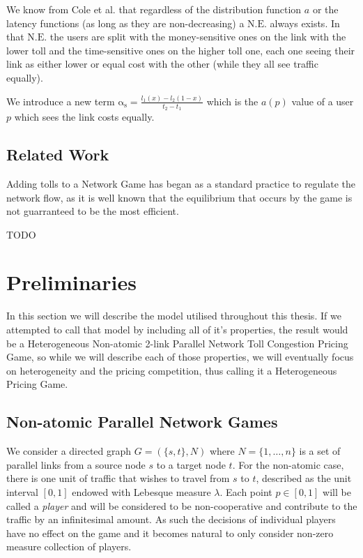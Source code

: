 \documentclass[10pt,a4paper]{book}
\newcommand{\NE}{\mathrm{N.E.}}
\newcommand{\as}{\mathrm{\alpha_s}}
\theoremstyle{definition}
\theoremstyle{comment}
\begin{document}
We know from Cole et al. \cite{10.1145/780542.780618} that regardless of the distribution function $a$ or the latency functions (as long as they are non-decreasing) a $\NE$ always exists.
In that $\NE$ the users are split with the money-sensitive ones on the link with the lower toll and the time-sensitive ones on the higher toll one, each one seeing their link as either lower or equal cost with the other (while they all see traffic equally).

We introduce a new term $\as=\frac{l_1(x)-l_2(1-x)}{t_2-t_1}$ which is the $a(p)$ value of a user $p$ which sees the link costs equally.


\section{Related Work}

Adding tolls to a Network Game has began as a standard practice to regulate the network flow, as it is well known that the equilibrium that occurs by the game is not guarranteed to be the most efficient.

TODO

\cleardoublepage


\chapter{Preliminaries}

In this section we will describe the model utilised throughout this thesis.
If we attempted to call that model by including all of it's properties, the result would be a Heterogeneous Non-atomic 2-link Parallel Network Toll Congestion Pricing Game, so while we will describe each of those properties, we will eventually focus on heterogeneity and the pricing competition, thus calling it a Heterogeneous Pricing Game.

\section*{Non-atomic Parallel Network Games}

We consider a directed graph $G = (\{s, t\}, N)$ where $N = \{1,\dots, n\}$ is a set of parallel links from a source node $s$ to a target node $t$.
For the non-atomic case, there is one unit of traffic that wishes to travel from $s$ to $t$, described as the unit interval $[0, 1]$ endowed with Lebesque measure $\lambda$.
Each point $p \in [0, 1]$ will be called a \textit{player} and will be considered to be non-cooperative and contribute to the traffic by an infinitesimal amount.
As such the decisions of individual players have no effect on the game and it becomes natural to only consider non-zero measure collection of players.
\end{document}
